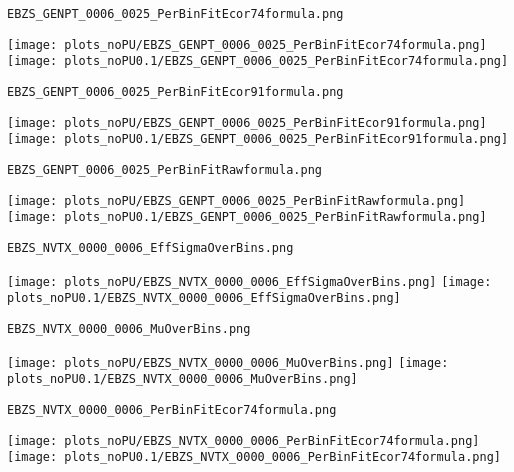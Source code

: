 \begin{frame}[fragile]
\begin{verbatim}
EBZS_GENPT_0006_0025_PerBinFitEcor74formula.png
\end{verbatim}
\texttt{[image: plots\_noPU/EBZS\_GENPT\_0006\_0025\_PerBinFitEcor74formula.png]}
\texttt{[image: plots\_noPU0.1/EBZS\_GENPT\_0006\_0025\_PerBinFitEcor74formula.png]}
\end{frame}
\begin{frame}[fragile]
\begin{verbatim}
EBZS_GENPT_0006_0025_PerBinFitEcor91formula.png
\end{verbatim}
\texttt{[image: plots\_noPU/EBZS\_GENPT\_0006\_0025\_PerBinFitEcor91formula.png]}
\texttt{[image: plots\_noPU0.1/EBZS\_GENPT\_0006\_0025\_PerBinFitEcor91formula.png]}
\end{frame}
\begin{frame}[fragile]
\begin{verbatim}
EBZS_GENPT_0006_0025_PerBinFitRawformula.png
\end{verbatim}
\texttt{[image: plots\_noPU/EBZS\_GENPT\_0006\_0025\_PerBinFitRawformula.png]}
\texttt{[image: plots\_noPU0.1/EBZS\_GENPT\_0006\_0025\_PerBinFitRawformula.png]}
\end{frame}
\begin{frame}[fragile]
\begin{verbatim}
EBZS_NVTX_0000_0006_EffSigmaOverBins.png
\end{verbatim}
\texttt{[image: plots\_noPU/EBZS\_NVTX\_0000\_0006\_EffSigmaOverBins.png]}
\texttt{[image: plots\_noPU0.1/EBZS\_NVTX\_0000\_0006\_EffSigmaOverBins.png]}
\end{frame}
\begin{frame}[fragile]
\begin{verbatim}
EBZS_NVTX_0000_0006_MuOverBins.png
\end{verbatim}
\texttt{[image: plots\_noPU/EBZS\_NVTX\_0000\_0006\_MuOverBins.png]}
\texttt{[image: plots\_noPU0.1/EBZS\_NVTX\_0000\_0006\_MuOverBins.png]}
\end{frame}
\begin{frame}[fragile]
\begin{verbatim}
EBZS_NVTX_0000_0006_PerBinFitEcor74formula.png
\end{verbatim}
\texttt{[image: plots\_noPU/EBZS\_NVTX\_0000\_0006\_PerBinFitEcor74formula.png]}
\texttt{[image: plots\_noPU0.1/EBZS\_NVTX\_0000\_0006\_PerBinFitEcor74formula.png]}
\end{frame}
